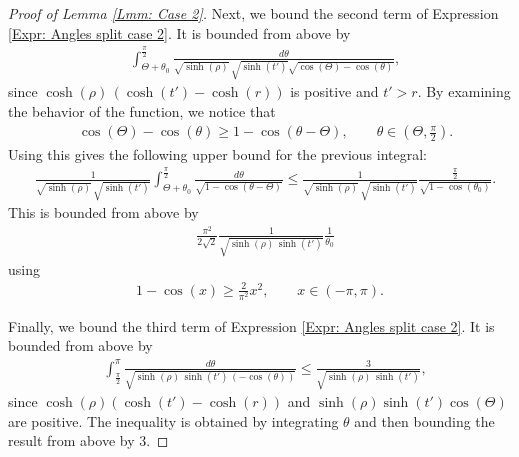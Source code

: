 \documentclass[11pt,twoside,reqno]{amsart} \usepackage{a4wide} \usepackage[T1]{fontenc} \usepackage[utf8]{inputenc} \usepackage{soul}  \usepackage{amsmath} \usepackage{amsfonts} \usepackage{amssymb} \usepackage{mathtools} \usepackage{amsthm} \usepackage{xcolor} \usepackage{graphicx} \usepackage{hyperref} \usepackage{standalone} \usepackage{esint} \usepackage{comment} \usepackage[left=2.3cm,top=3cm,right=2.3cm]{geometry} \usepackage{bm} \usepackage{svg} \usepackage{float} \numberwithin{equation}{section} \theoremstyle{plain} \newtheorem{thm}{Theorem}[section] \newtheorem{theorem}[thm]{Theorem} \newtheorem*{theorem*}{Theorem}\newtheorem{conj}[thm]{Conjecture} \newtheorem{lemma}[thm]{Lemma} \newtheorem{prop}[thm]{Proposition} \newtheorem{proposition}[thm]{Proposition} \newtheorem{cor}[thm]{Corollary} \newtheorem{question}[thm]{Question} \newtheorem{corollary}[thm]{Corollary} \newtheorem{assumption}[thm]{Assumption} \theoremstyle{definition} \newtheorem{defn}[thm]{Definition} \newtheorem{choice}[thm]{Choice} \newtheorem{definition}[thm]{Definition} \newtheorem{ex}[thm]{Example} \newtheorem{notation}[thm]{Notation} \newtheorem*{ack}{Acknowledgements} \theoremstyle{remark} \newtheorem{remark}[thm]{Remark} \newtheorem{bigremark}[thm]{Remark} \usepackage{xcolor} \newcommand{\red}[1]{ {\color{Red}#1} } \newcommand{\blue}[1]{ {\color{Blue}#1} } \author{Kai Hippi} \address{Aalto University, Espoo, Finland} \email{kai.hippi@aalto.fi}
\begin{document}
\begin{proof}[Proof of Lemma \ref{Lmm: Case 2}]
Next, we bound the second term of Expression \eqref{Expr: Angles split case 2}. It is bounded from above by 
\begin{align*}
	&
	\int_{\Theta + \theta_{0}}^{\frac{\pi}{2}} \frac{d \theta}{ \sqrt{ \sinh( \rho ) } \, \sqrt{ \sinh( t' ) } \sqrt{ \cos( \Theta ) - \cos( \theta ) } },
\end{align*}
since $ \cosh( \rho )\, ( \cosh( t' ) - \cosh( r ) ) $ is positive and $ t' > r $. By examining the behavior of the function, we notice that
\begin{align*}
	&
	\cos( \Theta ) - \cos( \theta ) \geq 1 - \cos( \theta - \Theta ), \qquad \theta \in ( \Theta, \tfrac{\pi}{2} ).
\end{align*}
Using this gives the following upper bound for the previous integral:
\begin{align*}
	&
	\frac{1}{ \sqrt{ \sinh( \rho ) } \, \sqrt{ \sinh( t' ) } } \int_{\Theta + \theta_{0}}^{\frac{\pi}{2}} \frac{d \theta}{ \sqrt{ 1 - \cos( \theta - \Theta ) } } \leq \frac{1}{ \sqrt{ \sinh( \rho ) } \, \sqrt{ \sinh( t' ) } } \frac{ \frac{\pi}{2} }{ \sqrt{ 1 - \cos( \theta_{0} ) } }.
\end{align*}
This is bounded from above by
\begin{align*}
	&
	\frac{ \pi^{2} }{ 2 \sqrt{2}} \frac{1}{\sqrt{ \sinh( \rho ) \, \sinh( t' ) }} \frac{1}{\theta_{0}}
\end{align*}
using
\begin{align*}
	1 - \cos( x ) \geq \frac{2}{\pi^{2}} x^{2}, \qquad x \in ( -\pi, \pi ).
\end{align*}

Finally, we bound the third term of Expression \eqref{Expr: Angles split case 2}. It is bounded from above by
\begin{align*}
	&
	\int_{\frac{\pi}{2}}^{\pi} \frac{d \theta}{ \sqrt{ \sinh( \rho ) \, \sinh( t' ) \,  (-\cos( \theta ))  } } \leq \frac{3}{ \sqrt{ \sinh( \rho ) \, \sinh( t' ) } },	
\end{align*}
since $ \cosh( \rho )( \cosh( t' ) - \cosh( r ) ) $ and $ \sinh( \rho ) \sinh( t' ) \cos( \Theta ) $ are positive. The inequality is obtained by integrating $ \theta $ and then bounding the result from above by $ 3 $. 


\end{proof}
\end{document}
